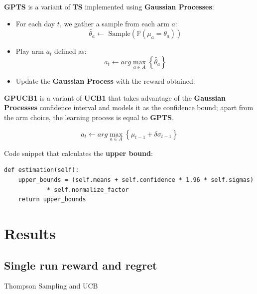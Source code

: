 \textbf{GPTS} is a variant of \textbf{TS} implemented using \textbf{Gaussian Processes}:

\begin{itemize}
	\item For each day $t$, we gather a sample from each arm $a$:
		\begin{displaymath}
			\tilde{\theta_a} \leftarrow \text{ Sample} \left( \mathbb{P}(\mu_a = \theta_a) \right)
		\end{displaymath}
	\item Play arm $a_t$ defined as:
		\begin{displaymath}
			a_t \leftarrow arg\max_{a \in A} \left\{ \tilde{\theta_a} \right\}
		\end{displaymath}
	\item Update the \textbf{Gaussian Process} with the reward obtained.
\end{itemize}

\textbf{GPUCB1} is a variant of \textbf{UCB1} that takes advantage of the \textbf{Gaussian Processes} confidence interval and models it as the confidence bound; apart from the arm choice, the learning process is equal to \textbf{GPTS}.

\begin{displaymath}
	a_t \leftarrow arg\max_{a \in A} \left\{ \mu_{t-1} + \delta \sigma_{t-1} \right\}
\end{displaymath}

Code snippet that calculates the \textbf{upper bound}:

\begin{lstlisting}[style=Python, basicstyle=\tiny, numbers=none, xrightmargin=15px]
def estimation(self):
	upper_bounds = (self.means + self.confidence * 1.96 * self.sigmas)
			* self.normalize_factor
	return upper_bounds
\end{lstlisting}

\section{Results}

\subsection{Single run reward and regret}

Thompson Sampling and UCB

